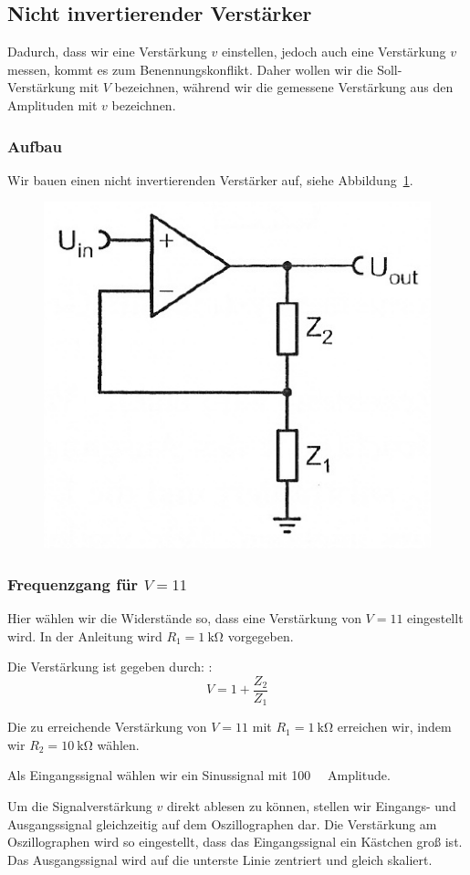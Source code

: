 \FloatBarrier
\subsection{Nicht invertierender Verstärker}

Dadurch, dass wir eine Verstärkung $v$ einstellen, jedoch auch eine Verstärkung
$v$ messen, kommt es zum Benennungskonflikt. Daher wollen wir die
Soll-Verstärkung mit $V$ bezeichnen, während wir die gemessene Verstärkung aus
den Amplituden mit $v$ bezeichnen.

\subsubsection{Aufbau}

Wir bauen einen nicht invertierenden Verstärker auf, siehe
Abbildung~\ref{fig:5_6-4}. 

\begin{figure}[htbp]
	\centering
	\includegraphics[width=.4\linewidth]{Anleitung/5_6-4.png}
	\caption{%
		\cite[Abbildung~5/6.4]{physik313-Anleitung}
	}
	\label{fig:5_6-4}
\end{figure}

\subsubsection{Frequenzgang für $V = 11$}

Hier wählen wir die Widerstände so, dass eine Verstärkung von $V = 11$
eingestellt wird. In der Anleitung wird $R_1 = \SI{1}{\kilo\ohm}$ vorgegeben.

Die Verstärkung ist gegeben durch: \cite[Formel~5/6.6]{physik313-Anleitung}:
\[
	V = 1 + \frac{Z_2}{Z_1}
\]

Die zu erreichende Verstärkung von $V = 11$ mit $R_1 = \SI{1}{\kilo\ohm}$
erreichen wir, indem wir $R_2 = \SI{10}{\kilo\ohm}$ wählen.

Als Eingangssignal wählen wir ein Sinussignal mit \SI{100}{\milli\voltss}
Amplitude.

Um die Signalverstärkung $v$ direkt ablesen zu können, stellen wir Eingangs-
und Ausgangssignal gleichzeitig auf dem Oszillographen dar. Die Verstärkung am
Oszillographen wird so eingestellt, dass das Eingangssignal ein Kästchen groß
ist. Das Ausgangssignal wird auf die unterste Linie zentriert und gleich
skaliert.

